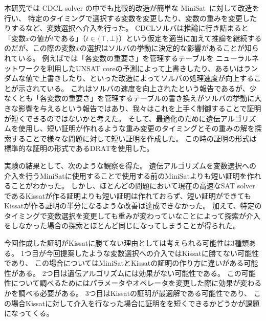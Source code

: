 

本研究では CDCL solver の中でも比較的改造が簡単な MiniSat~\cite{MINISAT}に対して改造を行い、
特定のタイミングで選択する変数を変更したり、変数の重みを変更したりするなど、変数選択へ介入を行った。
CDCLソルバは推論に行き詰まると「変数\( x \)の値が\( t \)である」（\( t \in \{ \top, \bot \} \)）という仮定を適当に加えて推論を継続するのだが、この際の変数\( x \)の選択はソルバの挙動に決定的な影響があることが知られている。
例えば\cite{neuralnet-vs-random-VSIDS}では「各変数の重要さ」を管理するテーブルを
ニューラルネットワークを利用したUNSAT coreの予測によって上書きしたり、あるいはランダムな値で上書きしたり、といった改造によってソルバの処理速度が向上することが示されている。
これはソルバの速度を向上されたという報告であるが、少なくとも「各変数の重要さ」を管理するテーブルの書き換えがソルバの挙動に大きな影響を与えるという報告ではあり、我々はこれを上手く制御することで証明が短くできるのではないかと考えた。
そして、最適化のために遺伝アルゴリズム\cite{GA}を使用し、短い証明が作れるような重み変更のタイミングとその重みの解を探索することで様々な問題に対して短い証明を作成した。
この時の証明の形式は標準的な証明の形式であるDRAT\cite{DRAT}を使用した。

実験の結果として、次のような観察を得た。
遺伝アルゴリズムを変数選択への介入を行うMiniSatに使用することで使用する前のMiniSatよりも短い証明を作れることがわかった。
しかし、ほとんどの問題において現在の高速なSAT solverであるKissatが作る証明よりも短い証明は作れておらず、短い証明ができてもKissatが作る証明の半分になるような改善は達成できなかった。
加えて、特定のタイミングで変数選択を変更しても重みが変わっていなことによって探索が介入をしなかった場合の探索とほとんど同じになってしまうことが得られた。

今回作成した証明がKissatに勝てない理由としては考えられる可能性は3種類ある。
1つ目が今回提案したような変数選択への介入ではKissatに勝てない可能性であり、
この場合についてはMiniSatとKissatの証明の作り方に違いがある可能性がある。
2つ目は遺伝アルゴリズムには効果がない可能性である。
この可能性について調べるためにはパラメータやオペレータを変更した際に効果が変わるかを調べる必要がある。
3つ目はKissatの証明が最適解である可能性であり、
この場合Kissatに対して介入を行なった場合に証明をを短くできるかどうかが課題になってくる。